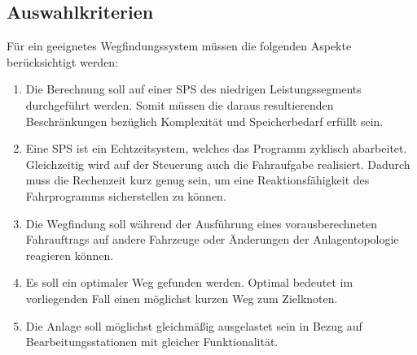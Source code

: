 	\subsection{Auswahlkriterien}
		\label{Kriterien_Alg}
		Für ein geeignetes Wegfindungssystem müssen die folgenden Aspekte berücksichtigt werden:
		\begin{enumerate}
			\item Die Berechnung soll auf einer \ac{SPS} des niedrigen Leistungssegments durchgeführt werden. Somit müssen die daraus resultierenden Beschränkungen bezüglich Komplexität  und Speicherbedarf erfüllt sein.
			\item Eine \ac{SPS} ist ein Echtzeitsystem, welches das Programm zyklisch abarbeitet. Gleichzeitig wird auf der Steuerung auch die Fahraufgabe realisiert. Dadurch muss die Rechenzeit kurz genug sein, um eine Reaktionsfähigkeit des Fahrprogramms sicherstellen zu können.
			\item Die Wegfindung soll während der Ausführung eines vorausberechneten Fahrauftrags auf andere Fahrzeuge oder Änderungen der Anlagentopologie reagieren können.
			\item Es soll ein optimaler Weg gefunden werden. Optimal bedeutet im vorliegenden Fall einen möglichst kurzen Weg zum Zielknoten.
			\item Die Anlage soll möglichst gleichmäßig ausgelastet sein in Bezug auf Bearbeitungsstationen mit gleicher Funktionalität.
		\end{enumerate}
		
